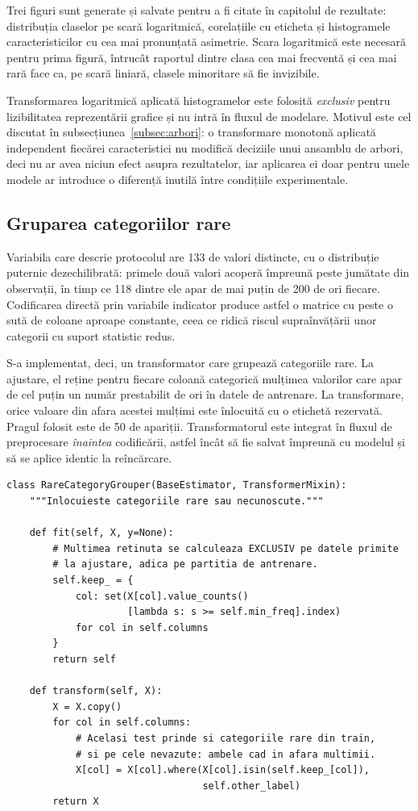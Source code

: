 Trei figuri sunt generate și salvate pentru a fi citate în capitolul de rezultate: distribuția claselor pe scară logaritmică, corelațiile cu eticheta și histogramele caracteristicilor cu cea mai pronunțată asimetrie. Scara logaritmică este necesară pentru prima figură, întrucât raportul dintre clasa cea mai frecventă și cea mai rară face ca, pe scară liniară, clasele minoritare să fie invizibile.

Transformarea logaritmică aplicată histogramelor este folosită \emph{exclusiv} pentru lizibilitatea reprezentării grafice și nu intră în fluxul de modelare. Motivul este cel discutat în subsecțiunea~\ref{subsec:arbori}: o transformare monotonă aplicată independent fiecărei caracteristici nu modifică deciziile unui ansamblu de arbori, deci nu ar avea niciun efect asupra rezultatelor, iar aplicarea ei doar pentru unele modele ar introduce o diferență inutilă între condițiile experimentale.

\subsection{Gruparea categoriilor rare}\label{subsec:rare}

Variabila care descrie protocolul are 133 de valori distincte, cu o distribuție puternic dezechilibrată: primele două valori acoperă împreună peste jumătate din observații, în timp ce 118 dintre ele apar de mai puțin de 200 de ori fiecare. Codificarea directă prin variabile indicator produce astfel o matrice cu peste o sută de coloane aproape constante, ceea ce ridică riscul supraînvățării unor categorii cu suport statistic redus.

S-a implementat, deci, un transformator care grupează categoriile rare. La ajustare, el reține pentru fiecare coloană categorică mulțimea valorilor care apar de cel puțin un număr prestabilit de ori în datele de antrenare. La transformare, orice valoare din afara acestei mulțimi este înlocuită cu o etichetă rezervată. Pragul folosit este de 50 de apariții. Transformatorul este integrat în fluxul de preprocesare \emph{înaintea} codificării, astfel încât să fie salvat împreună cu modelul și să se aplice identic la reîncărcare.

\begin{verbatim}
class RareCategoryGrouper(BaseEstimator, TransformerMixin):
    """Inlocuieste categoriile rare sau necunoscute."""

    def fit(self, X, y=None):
        # Multimea retinuta se calculeaza EXCLUSIV pe datele primite
        # la ajustare, adica pe partitia de antrenare.
        self.keep_ = {
            col: set(X[col].value_counts()
                     [lambda s: s >= self.min_freq].index)
            for col in self.columns
        }
        return self

    def transform(self, X):
        X = X.copy()
        for col in self.columns:
            # Acelasi test prinde si categoriile rare din train,
            # si pe cele nevazute: ambele cad in afara multimii.
            X[col] = X[col].where(X[col].isin(self.keep_[col]),
                                  self.other_label)
        return X
\end{verbatim}

